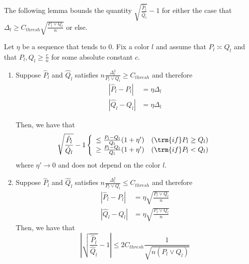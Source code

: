 \documentclass{article}
\begin{document}
The following lemma bounds the quantity $\sqrt{ \frac{\hat{P}_l}{\hat{Q}_l}} - 1$ for either the case that $\Delta_l \geq C_{thresh} \sqrt{ \frac{P_l \vee Q_l}{n} }$ or else. 

\begin{lemma}
\label{lem:sqrt_ratio_pl_ql_minus_1}
Let $\eta$ be a sequence that tends to 0. Fix a color $l$ and assume that $P_l \asymp Q_l$ and that $P_l, Q_l \geq \frac{c}{n}$ for some absolute constant $c$. 
\begin{enumerate}
\item 
Suppose $\hat{P}_l$ and $\hat{Q}_l$ satisfies $n \frac{\Delta_l^2}{P_l \vee Q_l} \geq C_{thresh}$ and therefore
\begin{align*}
| \hat{P}_l - P_l | &= \eta \Delta_l  \\
| \hat{Q}_l - Q_l | &= \eta \Delta_l  
\end{align*}

Then, we have that 
\[
\sqrt{ \frac{\hat{P}_l }{\hat{Q}_l} } - 1 \left\{ \begin{array}{cc} 
                    \leq \frac{P_l - Q_l}{Q_l} (1 + \eta') & (\trm{if }  P_l \geq Q_l) \\
                    \geq \frac{P_l - Q_l}{Q_l} (1 + \eta') & (\trm{if } P_l < Q_l) 
           \end{array} \right.
\]
where $\eta' \rightarrow 0$ and does not depend on the color $l$. 

\item
Suppose $\hat{P}_l$ and $\hat{Q}_l$ satisfies $n \frac{\Delta_l^2}{P_l \vee Q_l} \leq C_{thresh}$ and therefore
\begin{align*}
| \hat{P}_l - P_l | &= \eta \sqrt{ \frac{P_l \vee Q_l}{n} } \\
| \hat{Q}_l - Q_l | &= \eta \sqrt{ \frac{P_l \vee Q_l}{n} }
\end{align*}
Then, we have that
\[
\left| \sqrt{ \frac{\hat{P}_l}{\hat{Q}_l} } - 1 \right| \leq
 2 C_{thresh} \frac{1}{\sqrt{n  (P_l \vee Q_l) } }
\]

\end{enumerate}
\end{lemma}
\end{document}
